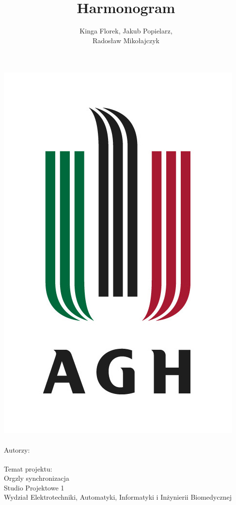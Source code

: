 \documentclass[12pt]{article}
\title{Harmonogram}
\author{Kinga Florek, Jakub Popielarz, \\Radosław Mikołajczyk}
\begin{document}
\makeatletter
    \begin{titlepage}
        \begin{center}
            \includegraphics[scale=0.8]{agh_znk_wbr_rgb_150ppi.jpg}\\ \bigbreak
            {\Huge \bfseries  \@title }\\[2ex] 
            {\large Autorzy: \\ \@author}\\ \bigbreak
            {\large Temat projektu: \\ Orgzly synchronizacja} \\ \bigbreak
            \vspace{8mm}
            {\huge Studio Projektowe 1} \\ \bigbreak
            {\large Wydział Elektrotechniki, Automatyki, Informatyki i Inżynierii Biomedycznej} \\ 
        \end{center}
    \end{titlepage}
\makeatother
\end{document}
